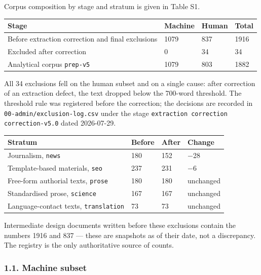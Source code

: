 \documentclass[11pt,a4paper]{article}
\renewcommand{\_}{\textunderscore\allowbreak}
\begin{document}
Corpus composition by stage and stratum is given in Table S1.

\begin{center}
\small
\begin{tabularx}{\textwidth}{Xlll}
\toprule
Stage & Machine & Human & Total \\
\midrule
Before extraction correction and final exclusions & 1079 & 837 & 1916 \\
Excluded after correction & 0 & 34 & 34 \\
Analytical corpus \texttt{prep-\allowbreak{}v5} & 1079 & 803 & 1882 \\
\bottomrule
\end{tabularx}
\end{center}

All 34 exclusions fell on the human subset and on a single cause: after
correction of an extraction defect, the text dropped below the 700-word threshold.
The threshold rule was registered before the correction; the decisions are recorded
in \texttt{00-\allowbreak{}admin/exclusion-\allowbreak{}log.csv} under the stage \texttt{extraction correction correction-\allowbreak{}v5.0}
dated 2026-07-29.

\begin{center}
\small
\begin{tabular}{llll}
\toprule
Stratum & Before & After & Change \\
\midrule
Journalism, \texttt{news} & 180 & 152 & $-$28 \\
Template-based materials, \texttt{seo} & 237 & 231 & $-$6 \\
Free-form authorial texts, \texttt{prose} & 180 & 180 & unchanged \\
Standardised prose, \texttt{science} & 167 & 167 & unchanged \\
Language-contact texts, \texttt{translation} & 73 & 73 & unchanged \\
\bottomrule
\end{tabular}
\end{center}

Intermediate design documents written before these exclusions contain the numbers
1916 and 837 — these are snapshots as of their date, not a discrepancy. The registry
is the only authoritative source of counts.

\subsubsection{1.1. Machine subset}
\end{document}
